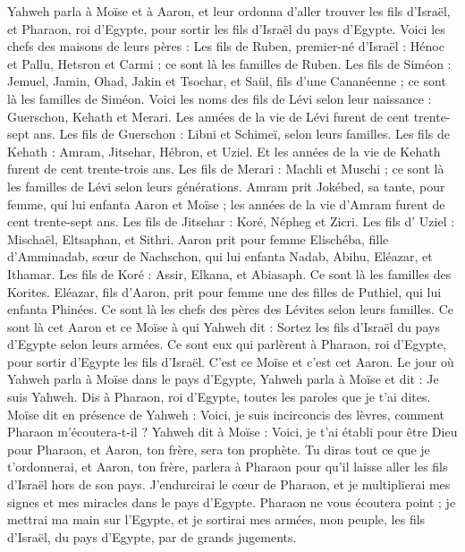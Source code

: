 \begin{multicols}{2}
Yahweh parla à Moïse et à Aaron, et leur ordonna d'aller trouver les fils d'Israël, et Pharaon, roi d'Egypte, pour sortir les fils d'Israël du pays d'Egypte.
Voici les chefs des maisons de leurs pères : Les fils de Ruben, premier-né d'Israël : Hénoc et Pallu, Hetsron et Carmi ; ce sont là les familles de Ruben.
Les fils de Siméon : Jemuel, Jamin, Ohad, Jakin et Tsochar, et Saül, fils d'une Cananéenne ; ce sont là les familles de Siméon.
Voici les noms des fils de Lévi selon leur naissance : Guerschon, Kehath et Merari. Les années de la vie de Lévi furent de cent trente-sept ans.
Les fils de Guerschon : Libni et Schimeï, selon leurs familles.
Les fils de Kehath : Amram, Jitsehar, Hébron, et Uziel. Et les années de la vie de Kehath furent de cent trente-trois ans.
Les fils de Merari : Machli et Muschi ; ce sont là les familles de Lévi selon leurs générations.
Amram prit Jokébed, sa tante, pour femme, qui lui enfanta Aaron et Moïse ; les années de la vie d’Amram furent de cent trente-sept ans.
Les fils de Jitsehar : Koré, Népheg et Zicri.
Les fils d’ Uziel : Mischaël, Eltsaphan, et Sithri.
Aaron prit pour femme Elischéba, fille d’Amminadab, sœur de Nachschon, qui lui enfanta Nadab, Abihu, Eléazar, et Ithamar.
Les fils de Koré : Assir, Elkana, et Abiasaph. Ce sont là les familles des Korites.
Eléazar, fils d'Aaron, prit pour femme une des filles de Puthiel, qui lui enfanta Phinées. Ce sont là les chefs des pères des Lévites selon leurs familles.
Ce sont là cet Aaron et ce Moïse à qui Yahweh dit : Sortez les fils d'Israël du pays d'Egypte selon leurs armées.
Ce sont eux qui parlèrent à Pharaon, roi d'Egypte, pour sortir d'Egypte les fils d'Israël. C'est ce Moïse et c'est cet Aaron.
Le jour où Yahweh parla à Moïse dans le pays d'Egypte,
Yahweh parla à Moïse et dit : Je suis Yahweh. Dis à Pharaon, roi d'Egypte, toutes les paroles que je t'ai dites.
Moïse dit en présence de Yahweh : Voici, je suis incirconcis des lèvres, comment Pharaon m'écoutera-t-il ?
\VerseOne{}Yahweh dit à Moïse : Voici, je t'ai établi pour être Dieu pour Pharaon, et Aaron, ton frère, sera ton prophète.
Tu diras tout ce que je t’ordonnerai, et Aaron, ton frère, parlera à Pharaon pour qu'il laisse aller les fils d'Israël hors de son pays.
J'endurcirai le cœur de Pharaon, et je multiplierai mes signes et mes miracles dans le pays d'Egypte.
Pharaon ne vous écoutera point ; je mettrai ma main sur l'Egypte, et je sortirai mes armées, mon peuple, les fils d'Israël, du pays d'Egypte, par de grands jugements.

\end{multicols}
